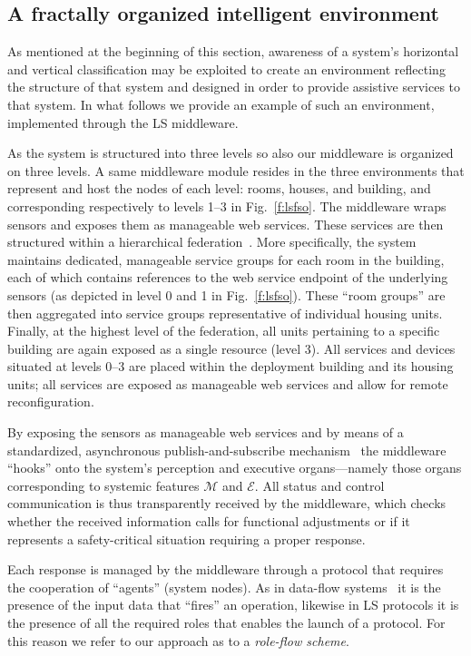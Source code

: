 \documentclass[twocolumn]{svjour3}
\def\M{\hbox{$\mathcal{M}$}}
\def\E{\hbox{$\mathcal{E}$}}
\begin{document}
\subsection{A fractally organized intelligent environment}\label{s:fso:fso}
As mentioned at the beginning of this section, awareness of a system's horizontal and vertical
classification may be exploited to create an environment reflecting the structure of that system
and designed in order to provide assistive services to that system. In what follows we provide
an example of such an environment, implemented through the LS middleware.

As the system is structured into three levels so also our middleware is organized on three levels.
A same middleware module resides 
in the three environments that represent and host the nodes of each level: rooms, houses, and building,
and corresponding respectively to levels 1--3 in Fig.~\ref{f:lsfso}. The middleware
wraps sensors and exposes them as manageable web services. These services are
then structured within a hierarchical federation~\cite{Oasis1}. 
More specifically, the system maintains
dedicated, manageable service groups for each room in the building,
each of which contains references to the web service endpoint of the
underlying sensors (as depicted in level 0 and 1 in Fig.~\ref{f:lsfso}).  These
``room groups'' are then aggregated into service groups
representative of individual housing units. Finally, at the highest
level of the federation, all units pertaining to a specific building
are again exposed as a single resource (level 3).  All services and
devices situated at levels 0--3 are placed within the
deployment building and its housing units; all services are exposed as
manageable web services and allow for remote reconfiguration.

By exposing the sensors as manageable web services and by means
of a standardized, asynchronous publish-and-subscribe mechanism~\cite{Oasis2} the
middleware ``hooks'' onto the system's perception and executive organs---namely
those organs corresponding to systemic features \M{} and \E.
All status and control communication is thus transparently received by the middleware, which 
checks whether the received information calls for functional adjustments or if it
represents a safety-critical situation requiring a proper response.

Each response is managed by the middleware
through a protocol that requires the cooperation of ``agents'' (system nodes).
As in data-flow systems~\cite{Sharp:1992:DFC:140762,Tom67}
it is the presence of the input data that ``fires'' an operation, likewise in LS protocols
it is the presence of all the required roles
that enables the launch of a protocol. For this reason we refer to our
approach as to a \emph{role-flow scheme}.
\end{document}
